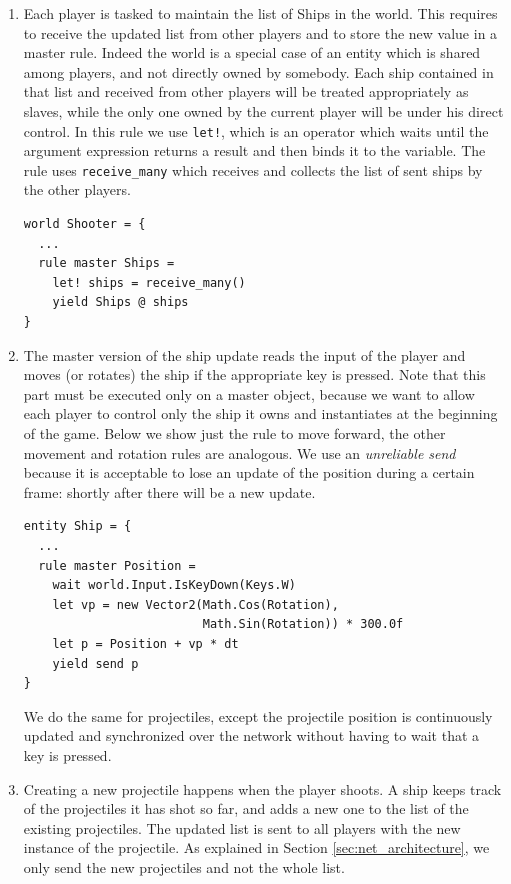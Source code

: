 \begin{enumerate}[leftmargin=*,labelsep=3mm,label=\roman*]
	\item Each player is tasked to maintain the list of Ships in the world. This requires to receive the updated list from other players and to store the new value in a master rule. Indeed the world is a special case of an entity which is shared among players, and not directly owned by somebody. Each ship contained in that list and received from other players will be treated appropriately as slaves, while the only one owned by the current player will be under his direct control. In this rule we use \texttt{let!}, which is an operator which waits until the argument expression returns a result and then binds it to the variable. The rule uses \texttt{receive\_many} which receives and collects the list of sent ships by the other players.
	
	\begin{lstlisting}
world Shooter = {
  ...
  rule master Ships =
    let! ships = receive_many()
    yield Ships @ ships
}
	\end{lstlisting}
	
	\item The master version of the ship update reads the input of the player and moves (or rotates) the ship if the appropriate key is pressed. Note that this part must be executed only on a master object, because we want to allow each player to control only the ship it owns and instantiates at the beginning of the game. Below we show just the rule to move forward, the other movement and rotation rules are analogous. We use an \textit{unreliable send} because it is acceptable to lose an update of the position during a certain frame: shortly after there will be a new update.
	
	\begin{lstlisting}
entity Ship = {
  ...
  rule master Position =
    wait world.Input.IsKeyDown(Keys.W)
    let vp = new Vector2(Math.Cos(Rotation), 
                         Math.Sin(Rotation)) * 300.0f
    let p = Position + vp * dt
    yield send p
}
	\end{lstlisting}
	
	We do the same for projectiles, except the projectile position is continuously updated and synchronized over the network without having to wait that a key is pressed.
	
	\item Creating a new projectile happens when the player shoots. A ship keeps track of the projectiles it has shot so far, and adds a new one to the list of the existing projectiles. The updated list is sent to all players with the new instance of the projectile. As explained in Section \ref{sec:net_architecture}, we only send the new projectiles and not the whole list.
	

\end{enumerate}
